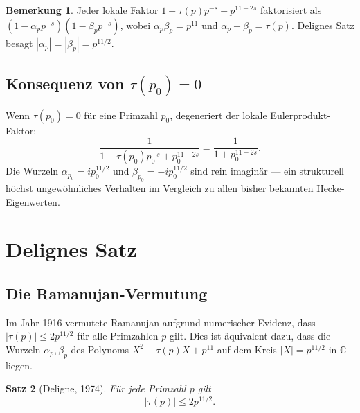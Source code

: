 \documentclass[12pt,a4paper]{amsart}
\newtheorem{theorem}{Satz}[section]
\theoremstyle{definition}
\newtheorem{remark}[theorem]{Bemerkung}
\begin{document}
\begin{remark}
  Jeder lokale Faktor $1 - \tau(p)p^{-s} + p^{11-2s}$ faktorisiert als
  $(1 - \alpha_p p^{-s})(1 - \beta_p p^{-s})$, wobei $\alpha_p \beta_p = p^{11}$
  und $\alpha_p + \beta_p = \tau(p)$. Delignes Satz besagt
  $|\alpha_p| = |\beta_p| = p^{11/2}$.
\end{remark}

\subsection{Konsequenz von $\tau(p_0) = 0$}

Wenn $\tau(p_0) = 0$ für eine Primzahl $p_0$, degeneriert der lokale Eulerprodukt-Faktor:
\[
  \frac{1}{1 - \tau(p_0)p_0^{-s} + p_0^{11-2s}}
  = \frac{1}{1 + p_0^{11-2s}}.
\]
Die Wurzeln $\alpha_{p_0} = ip_0^{11/2}$ und $\beta_{p_0} = -ip_0^{11/2}$ sind rein
imaginär --- ein strukturell höchst ungewöhnliches Verhalten im Vergleich zu allen
bisher bekannten Hecke-Eigenwerten.

\section{Delignes Satz}
\label{sec:deligne}

\subsection{Die Ramanujan-Vermutung}

Im Jahr 1916 vermutete Ramanujan aufgrund numerischer Evidenz, dass
$|\tau(p)| \leq 2p^{11/2}$ für alle Primzahlen $p$ gilt. Dies ist äquivalent dazu,
dass die Wurzeln $\alpha_p, \beta_p$ des Polynoms $X^2 - \tau(p)X + p^{11}$ auf dem
Kreis $|X| = p^{11/2}$ in $\mathbb{C}$ liegen.

\begin{theorem}[Deligne, 1974]\label{thm:deligne}
  Für jede Primzahl $p$ gilt
  \[
    |\tau(p)| \leq 2p^{11/2}.
  \]
\end{theorem}
\end{document}
